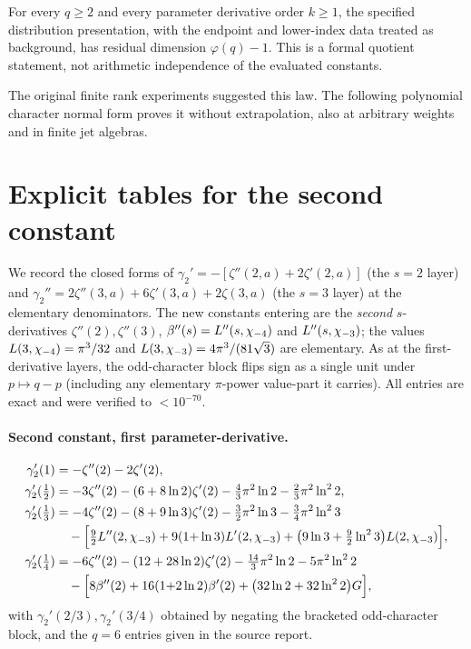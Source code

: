 \begin{corollary}\label{tower:thm:rank}
For every $q\ge2$ and every parameter derivative order $k\ge1$, the
specified distribution presentation, with the endpoint and lower-index
data treated as background, has residual dimension $\varphi(q)-1$.
This is a formal quotient statement, not arithmetic independence of the
evaluated constants.
\end{corollary}
The original finite rank experiments suggested this law. The following
polynomial character normal form proves it without extrapolation, also
at arbitrary weights and in finite jet algebras.




\section{Explicit tables for the second constant}\label{tower:sec:tables}

We record the closed forms of $\gamma_2'=-[\zeta''(2,a)+2\zeta'(2,a)]$ (the
$s=2$ layer) and $\gamma_2''=2\zeta''(3,a)+6\zeta'(3,a)+2\zeta(3,a)$ (the $s=3$
layer) at the elementary denominators. The new constants entering are the
\emph{second} $s$-derivatives $\zeta''(2),\zeta''(3)$, $\beta''(s)=L''(s,\chi_{-4})$
and $L''(s,\chi_{-3})$; the values $L(3,\chi_{-4})=\pi^3/32$ and
$L(3,\chi_{-3})=4\pi^3/(81\sqrt3)$ are elementary. As at the first-derivative
layers, the odd-character block flips sign as a single unit under $p\mapsto q-p$
(including any elementary $\pi$-power value-part it carries). All entries are
exact and were verified to $<10^{-70}$.

\paragraph{Second constant, first parameter-derivative.}
\begin{align*}
\gamma_2'(1)   &= -\zeta''(2)-2\zeta'(2),\\
\gamma_2'(\tfrac12) &= -3\zeta''(2)-(6+8\ln2)\zeta'(2)-\tfrac43\pi^2\ln2-\tfrac23\pi^2\ln^2 2,\\
\gamma_2'(\tfrac13) &= -4\zeta''(2)-(8+9\ln3)\zeta'(2)-\tfrac32\pi^2\ln3-\tfrac34\pi^2\ln^2 3\\
 &\quad -\Bigl[\tfrac92 L''(2,\chi_{-3})+9(1{+}\ln3)L'(2,\chi_{-3})+\bigl(9\ln3+\tfrac92\ln^2 3\bigr)L(2,\chi_{-3})\Bigr],\\
\gamma_2'(\tfrac14) &= -6\zeta''(2)-(12+28\ln2)\zeta'(2)-\tfrac{14}{3}\pi^2\ln2-5\pi^2\ln^2 2\\
 &\quad -\Bigl[8\beta''(2)+16(1{+}2\ln2)\beta'(2)+\bigl(32\ln2+32\ln^2 2\bigr)G\Bigr],
\end{align*}
with $\gamma_2'(2/3),\gamma_2'(3/4)$ obtained by negating the bracketed
odd-character block, and the $q=6$ entries given in the source report.

